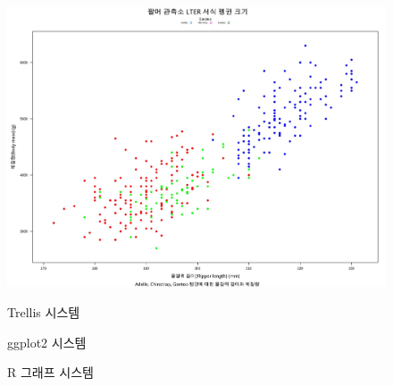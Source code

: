\documentclass[
  letterpaper,
]{book}
\begin{document}
\begin{figure}
\begin{minipage}[t]{0.33\linewidth}
{{\includegraphics{images/graphics_trellis.jpg}

}

\caption{Trellis 시스템}

}

\end{minipage}%
%
\begin{minipage}[t]{0.33\linewidth}

{\centering 


\caption{ggplot2 시스템}

}

\end{minipage}%

\caption{\label{fig-graphics}R 그래프 시스템}

\end{figure}
\end{document}
